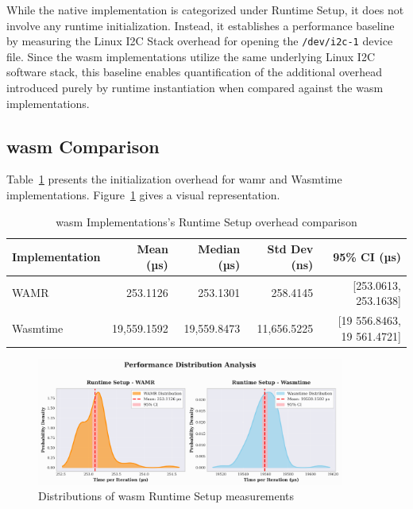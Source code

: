 While the native implementation is categorized under Runtime Setup, it does not involve any runtime initialization. Instead, it establishes a performance baseline by measuring the Linux I2C Stack overhead for opening the \texttt{/dev/i2c-1} device file. Since the \acrshort{wasm} implementations utilize the same underlying Linux I2C software stack, this baseline enables quantification of the additional overhead introduced purely by runtime instantiation when compared against the \acrshort{wasm} implementations.

\subsection{\acrlong{wasm} Comparison}
\label{subsec:eval-setup-wasm}

Table~\ref{tab:wasm-setup} presents the initialization overhead for \acrshort{wamr} and Wasmtime implementations. Figure~\ref{fig:wasm-setup-distribution} gives a visual representation.

\begin{table}[htbp]
    \centering
    \caption{\acrshort{wasm} Implementations's Runtime Setup overhead comparison}
    \label{tab:wasm-setup}
    \begin{tabular}{lrrrr}
        \toprule
        \textbf{Implementation} & \textbf{Mean (µs)} & \textbf{Median (µs)} & \textbf{Std Dev (ns)} & \textbf{95\% CI (µs)} \\
        \midrule
        WAMR        & 253.1126 & 253.1301 & 258.4145 & [253.0613, 253.1638] \\
        Wasmtime    & 19,559.1592 & 19,559.8473 & 11,656.5225 & [19 556.8463, 19 561.4721] \\
        \bottomrule
    \end{tabular}
\end{table}

\begin{figure}[htbp]
    \centering
    \includegraphics[width=0.9\textwidth]{images/wasm-setup-distribution}
    \caption{Distributions of \acrshort{wasm} Runtime Setup measurements}
    \label{fig:wasm-setup-distribution}
\end{figure}

